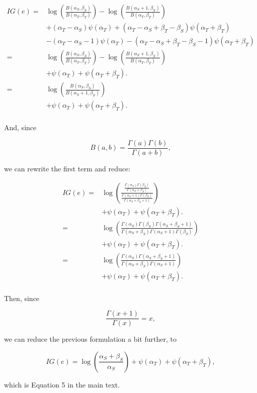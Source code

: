 \documentclass[12pt]{article}
\begin{document}
\begin{equation}
\begin{split}
IG(e)  = & \log( \frac{B(\alpha_{S},\beta_{S})}{B(\alpha_{T},\beta_{T})}) - \log( \frac{B(\alpha_{S}+1,\beta_{S})}{B(\alpha_{T},\beta_{T})}) \\ 
& + (\alpha_T - \alpha_S) \psi (\alpha_T) +  (\alpha_T - \alpha_S + \beta_T - \beta_S) \psi (\alpha_T + \beta_T)  \\
& - (\alpha_T - \alpha_{S} - 1) \psi (\alpha_T) - (\alpha_T - \alpha_{S} + \beta_T - \beta_{S} - 1) \psi (\alpha_T + \beta_T) \\
= & \log( \frac{B(\alpha_{S},\beta_{S})}{B(\alpha_{T},\beta_{T})})   - \log( \frac{B(\alpha_{S}+1,\beta_{S})}{B(\alpha_{T},\beta_{T})}) \\ 
& + \psi (\alpha_T) + \psi (\alpha_T + \beta_T). \\
= & \log( \frac{B(\alpha_{S},\beta_{S})}{B(\alpha_{S}+1,\beta_{S})})   \\
& + \psi (\alpha_T) + \psi (\alpha_T + \beta_T). \\
\end{split}
\end{equation}

\noindent And, since 

\begin{equation}
B(a,b) = \frac{\Gamma(a)\Gamma(b)}{\Gamma(a+b)},
\end{equation}

\noindent we can rewrite the first term and reduce:

\begin{equation}
\begin{split}
IG(e) = & \log( \frac{\frac{\Gamma(\alpha_S)\Gamma(\beta_S)}{\Gamma(\alpha_S+\beta_S)}}{\frac{\Gamma(\alpha_S + 1)\Gamma(\beta_S)}{\Gamma(\alpha_S+\beta_S + 1)}})   \\
& + \psi (\alpha_T) + \psi (\alpha_T + \beta_T). \\
=& \log( \frac{\Gamma(\alpha_S)\Gamma(\beta_S) \Gamma(\alpha_S+\beta_S + 1)}{\Gamma(\alpha_S+\beta_S) \Gamma(\alpha_S + 1)\Gamma(\beta_S)})   \\
& + \psi (\alpha_T) + \psi (\alpha_T + \beta_T). \\
=& \log( \frac{\Gamma(\alpha_S) \Gamma(\alpha_S+\beta_S + 1)}{\Gamma(\alpha_S+\beta_S) \Gamma(\alpha_S + 1)})   \\
& + \psi (\alpha_T) + \psi (\alpha_T + \beta_T). \\
\end{split}
\end{equation}

\noindent Then, since 

\begin{equation}
\frac{\Gamma(x + 1)}{\Gamma(x)} = x,
\end{equation}

\noindent we can reduce the previous formulation a bit further, to

\begin{equation}
IG(e) = \log(\frac{\alpha_S + \beta_S}{\alpha_S}) + \psi (\alpha_T) + \psi (\alpha_T + \beta_T), 
\end{equation}

\noindent which is Equation 5 in the main text. 
\end{document}

